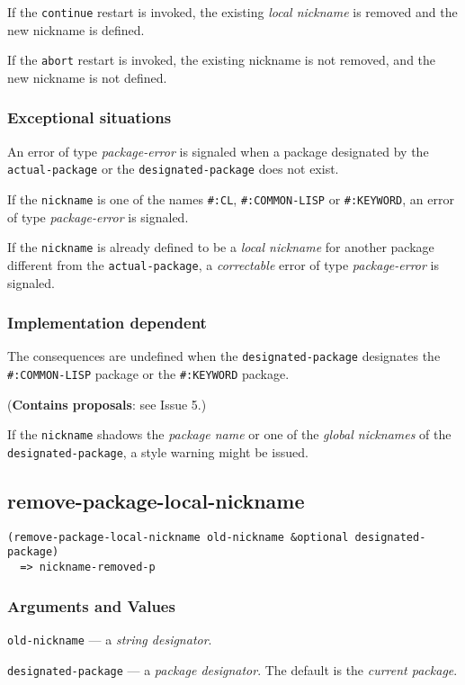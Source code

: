 \documentclass[11pt]{article}
\begin{document}
If the \texttt{continue} restart is invoked, the existing \emph{local nickname} is removed
and the new nickname is defined.

If the \texttt{abort} restart is invoked, the existing nickname is not removed, and the
new nickname is not defined.
\subsubsection{Exceptional situations}
\label{sec:orga8485eb}
An error of type \emph{package-error} is signaled when a package designated by the
\texttt{actual-package} or the \texttt{designated-package} does not exist.

If the \texttt{nickname} is one of the names \texttt{\#:CL}, \texttt{\#:COMMON-LISP} or \texttt{\#:KEYWORD}, an
error of type \emph{package-error} is signaled.

If the \texttt{nickname} is already defined to be a \emph{local nickname} for another package
different from the \texttt{actual-package}, a \emph{correctable} error of type \emph{package-error}
is signaled.
\subsubsection{Implementation dependent}
\label{sec:orgf7a5ab8}
The consequences are undefined when the \texttt{designated-package} designates the
\texttt{\#:COMMON-LISP} package or the \texttt{\#:KEYWORD} package.

(\textbf{Contains proposals}: see Issue 5.)

If the \texttt{nickname} shadows the \emph{package name} or one of the \emph{global nicknames} of
the \texttt{designated-package}, a style warning might be issued.
\subsection{remove-package-local-nickname}
\label{sec:org0f43d9b}
\begin{verbatim}
(remove-package-local-nickname old-nickname &optional designated-package)
  => nickname-removed-p
\end{verbatim}
\subsubsection{Arguments and Values}
\label{sec:org00134c8}
\texttt{old-nickname} --- a \emph{string designator}.

\texttt{designated-package} --- a \emph{package designator}.
The default is the \emph{current package}.
\end{document}
